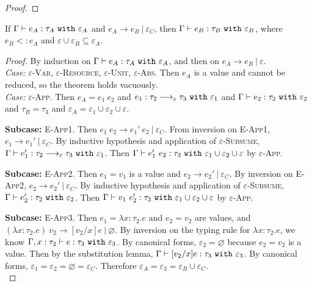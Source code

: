 \begin{appendix}
\begin{proof}
\end{proof}


\hrulefill

\begin{theorem}[Preservation]
If $ \Gamma \vdash  e_A:  \tau_A~\mathtt{with}~ \varepsilon_A$ and $e_A \longrightarrow e_B~|~\varepsilon_C$, then $ \Gamma \vdash e_B: \tau_B~\mathtt{with}~ \varepsilon_B$, where $e_B <: e_A$ and $\varepsilon \cup \varepsilon_B \subseteq \varepsilon_A$.
\end{theorem}

\begin{proof}
By induction on $ \Gamma \vdash  e_A:  \tau_A~\mathtt{with}~ \varepsilon_A$, and then on $e_A \longrightarrow e_B~|~\varepsilon$. \\

\textit{Case:} \textsc{$\varepsilon$-Var}, \textsc{$\varepsilon$-Resource}, \textsc{$\varepsilon$-Unit}, \textsc{$\varepsilon$-Abs}. Then $e_A$ is a value and cannot be reduced, so the theorem holds vacuously. \\

\textit{Case:} \textsc{$\varepsilon$-App}. Then $e_A =  e_1~ e_2$ and $ e_1:  \tau_2 \longrightarrow_{\varepsilon}  \tau_3~\mathtt{with}~ \varepsilon_1$ and $ \Gamma \vdash  e_2:  \tau_2~\mathtt{with}~ \varepsilon_2$ and $\tau_B = \tau_3$ and $\varepsilon_A = \varepsilon_1 \cup \varepsilon_2 \cup \varepsilon$.

\textbf{Subcase:} \textsc{E-App1}. Then $e_1~e_2 \longrightarrow e_1'~e_2~|~\varepsilon_C$. From inversion on \textsc{E-App1}, $e_1 \longrightarrow e_1'~|~\varepsilon_C$. By inductive hypothesis and application of \textsc{$\varepsilon$-Subsume}, $\Gamma \vdash e_1': \tau_2 \longrightarrow_{\varepsilon} \tau_3~\mathtt{with}~ \varepsilon_1$. Then $\Gamma \vdash e_1'~e_2: \tau_3~\mathtt{with}~ \varepsilon_1 \cup \varepsilon_2 \cup \varepsilon$ by \textsc{$\varepsilon$-App}.

\textbf{Subcase:} \textsc{E-App2}. Then $e_1 = v_1$ is a value and $e_2 \longrightarrow e_2'~|~\varepsilon_C$. By inversion on \textsc{E-App2}, $e_2 \longrightarrow e_2'~|~\varepsilon_C$. By inductive hypothesis and application of \textsc{$\varepsilon$-Subsume}, $\Gamma \vdash e_2': \tau_2~\mathtt{with}~ \varepsilon_2$. Then $\Gamma \vdash v_1~e_2': \tau_3~\mathtt{with}~ \varepsilon_1 \cup \varepsilon_2 \cup \varepsilon$ by \textsc{$\varepsilon$-App}.

\textbf{Subcase:} \textsc{E-App3}. Then $e_1 = \lambda x: \tau_2.e$ and $e_2 = v_2$ are values, and $(\lambda x: \tau_2.e)~v_2 \longrightarrow [v_2/x]e~|~\varnothing$. By inversion on the typing rule for $\lambda x:  \tau_2. e$, we know $\Gamma, x:  \tau_2 \vdash e: \tau_3~\mathtt{with}~ \varepsilon_3$. By canonical forms, $\varepsilon_2 = \varnothing$ because $ e_2 =  v_2$ is a value. Then by the substitution lemma, $ \Gamma \vdash [ v_2/x] e :  \tau_3~\mathtt{with}~ \varepsilon_3$. By canonical forms, $\varepsilon_1 = \varepsilon_2 = \varnothing = \varepsilon_C$. Therefore $\varepsilon_A = \varepsilon_3 = \varepsilon_B \cup \varepsilon_C$. \\


\end{proof}
\end{appendix}
